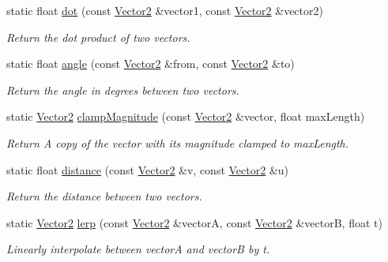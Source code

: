 \begin{DoxyCompactItemize}
static float \hyperlink{classfuzzy_telegram_1_1_vector2_abf357a902d0dea8bc2315d6a13bbd923}{dot} (const \hyperlink{classfuzzy_telegram_1_1_vector2}{Vector2} \&vector1, const \hyperlink{classfuzzy_telegram_1_1_vector2}{Vector2} \&vector2)
\begin{DoxyCompactList}\small\item\em Return the dot product of two vectors. \end{DoxyCompactList}\item 
static float \hyperlink{classfuzzy_telegram_1_1_vector2_a42831e50aa15c790080b9e7aa9757303}{angle} (const \hyperlink{classfuzzy_telegram_1_1_vector2}{Vector2} \&from, const \hyperlink{classfuzzy_telegram_1_1_vector2}{Vector2} \&to)
\begin{DoxyCompactList}\small\item\em Return the angle in degrees between two vectors. \end{DoxyCompactList}\item 
static \hyperlink{classfuzzy_telegram_1_1_vector2}{Vector2} \hyperlink{classfuzzy_telegram_1_1_vector2_a289f71dc080eb7862d7af4e99ef9830e}{clamp\+Magnitude} (const \hyperlink{classfuzzy_telegram_1_1_vector2}{Vector2} \&vector, float max\+Length)
\begin{DoxyCompactList}\small\item\em Return A copy of the vector with its magnitude clamped to max\+Length. \end{DoxyCompactList}\item 
static float \hyperlink{classfuzzy_telegram_1_1_vector2_a26345f59dedf2f8329bdabb1fa85b0ac}{distance} (const \hyperlink{classfuzzy_telegram_1_1_vector2}{Vector2} \&v, const \hyperlink{classfuzzy_telegram_1_1_vector2}{Vector2} \&u)
\begin{DoxyCompactList}\small\item\em Return the distance between two vectors. \end{DoxyCompactList}\item 
static \hyperlink{classfuzzy_telegram_1_1_vector2}{Vector2} \hyperlink{classfuzzy_telegram_1_1_vector2_a9df7c81fb42b8cc86a7363f85bc877e9}{lerp} (const \hyperlink{classfuzzy_telegram_1_1_vector2}{Vector2} \&vectorA, const \hyperlink{classfuzzy_telegram_1_1_vector2}{Vector2} \&vectorB, float t)
\begin{DoxyCompactList}\small\item\em Linearly interpolate between vectorA and vectorB by t. \end{DoxyCompactList}\end{DoxyCompactItemize}
